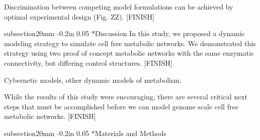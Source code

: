 \documentclass[12pt]{article}
\makeatletter
\renewcommand\section{\@startsection
	{subsection}{2}{0mm}
	{-0.2in}
	{0.05\baselineskip}
	{\normalfont\large\bfseries}}
\makeatother
\begin{document}
Discrimination between competing model formulations can be achieved by optimal experimental design (Fig. ZZ). [FINISH]



\clearpage

\section*{Discussion}
In this study, we proposed a dynamic modeling strategy to simulate cell free metabolic networks. We demonstrated this strategy using two proof of concept metabolic networks 
with the same enzymatic connectivity, but differing control structures. [FINISH]

Cybernetic models, other dynamic models of metabolism. 

While the results of this study were encouraging, there are several critical next steps that must be accomplished before we can model genome scale cell free metabolic networks.
[FINISH]

\section*{Materials and Methods}
\end{document}
